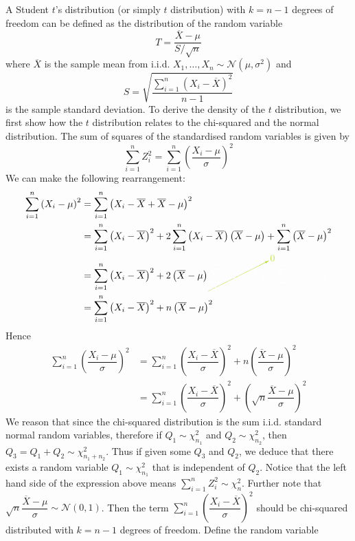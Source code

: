 \documentclass[11pt]{report} %
\begin{document}
A Student $t$'s distribution (or simply $t$ distribution) with $k = n - 1$ degrees of freedom can be defined as the distribution of the random variable
\begin{equation}
T = \dfrac{\overline{X} - \mu}{S/\sqrt{n}}
\end{equation}
where $\overline{X}$ is the sample mean from i.i.d. $X_{1}, \dots, X_{n} \sim \mathcal{N}\left(\mu, \sigma^{2}\right)$ and
\begin{equation}
S = \sqrt{\dfrac{\sum_{i = 1}^{n}\left(X_{i} - \overline{X}\right)^{2}}{n - 1}}
\end{equation}
is the sample standard deviation. To derive the density of the $t$ distribution, we first show how the $t$ distribution relates to the chi-squared and the normal distribution. The sum of squares of the standardised random variables is given by
\begin{equation}
\sum_{i = 1}^{n}Z_{i}^{2} = \sum_{i = 1}^{n}\left(\dfrac{X_{i} - \mu}{\sigma}\right)^{2}
\end{equation}
We can make the following rearrangement:
\begin{align}
\sum_{i = 1}^{n}\left(X_{i} - \mu\right)^{2} &= \sum_{i = 1}^{n}\left(X_{i} -  \overline{X} + \overline{X} - \mu\right)^{2} \\
&= \sum_{i=1}^{n}\left(X_{i}-\overline{X}\right)^{2}+2\sum_{i=1}^{n}\left(X_{i}-\overline{X}\right)\left(\overline{X}-\mu\right)+\sum_{i=1}^{n}\left(\overline{X}-\mu\right)^{2} \\
&= \sum_{i=1}^{n}\left(X_{i}-\overline{X}\right)^{2}+2\left(\overline{X}-\mu\right)\green\cancelto{0}{\black\sum_{i=1}^{n}\left(X_{i}-\overline{X}\right)}\black+\sum_{i=1}^{n}\left(\overline{X}-\mu\right)^{2} \\
&= \sum_{i=1}^{n}\left(X_{i}-\overline{X}\right)^{2}+n\left(\overline{X}-\mu\right)^{2}
\end{align}
Hence
\begin{align}
\sum_{i = 1}^{n}\left(\dfrac{X_{i} - \mu}{\sigma}\right)^{2} &= \sum_{i=1}^{n}\left(\dfrac{X_{i}-\overline{X}}{\sigma}\right)^{2}+n\left(\dfrac{\overline{X}-\mu}{\sigma}\right)^{2} \\
&= \sum_{i=1}^{n}\left(\dfrac{X_{i}-\overline{X}}{\sigma}\right)^{2}+\left(\sqrt{n}\dfrac{\overline{X}-\mu}{\sigma}\right)^{2}
\end{align}
We reason that since the chi-squared distribution is the sum i.i.d. standard normal random variables, therefore if $Q_{1}\sim\chi_{n_{1}}^{2}$ and $Q_{2}\sim\chi_{n_{2}}^{2}$, then $Q_{3} = Q_{1} + Q_{2} \sim \chi_{n_{1} + n_{2}}^{2}$. Thus if given some $Q_{3}$ and $Q_{2}$, we deduce that there exists a random variable $Q_{1} \sim \chi_{n_{1}}^{2}$ that is independent of $Q_{2}$. Notice that the left hand side of the expression above means $\sum_{i = 1}^{n}Z_{i}^{2} \sim \chi_{n}^{2}$. Further note that $\sqrt{n}\dfrac{\overline{X}-\mu}{\sigma} \sim \mathcal{N}\left(0, 1\right)$. Then the term $\sum_{i=1}^{n}\left(\dfrac{X_{i}-\overline{X}}{\sigma}\right)^{2}$ should be chi-squared distributed with $k = n - 1$ degrees of freedom. Define the random variable
\end{document}
